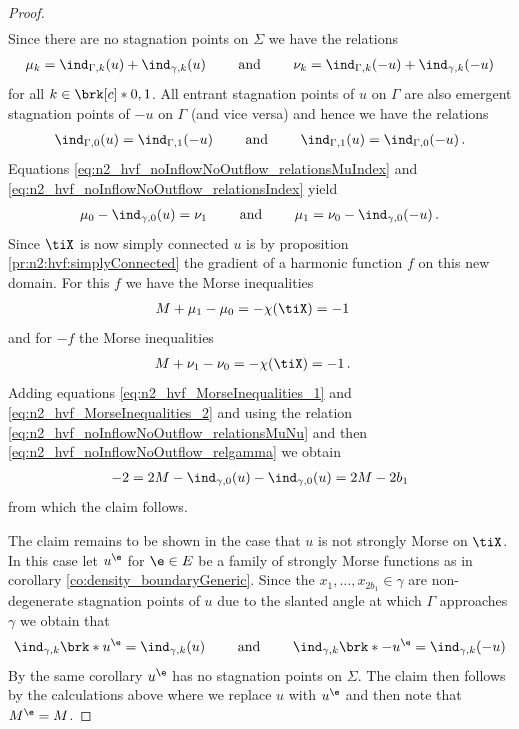 \begin{proof}
\begin{align}
  \end{align}
  Since there are no stagnation points on $\Sigma$ we have the relations
  \begin{align}
    \mu_k=\ind_{\Gamma,k}(u)+\ind_{\gamma,k}(u) \qquad\text{ and }\qquad
    \nu_k=\ind_{\Gamma,k}(-u)+\ind_{\gamma,k}(-u)\label{eq:n2_hvf_noInflowNoOutflow_relationsMuIndex}
  \end{align}
  for all $k\in\brk[c]*{0,1}$.
  All entrant stagnation points of $u$ on $\Gamma$ are also emergent
  stagnation points of $-u$ on $\Gamma$ (and vice versa) and hence we have the relations
  \begin{align}
    \ind_{\Gamma,0}(u)=\ind_{\Gamma,1}(-u) \qquad\text{ and }\qquad
    \ind_{\Gamma,1}(u)=\ind_{\Gamma,0}(-u)\,.\label{eq:n2_hvf_noInflowNoOutflow_relationsIndex}
  \end{align}
  Equations \eqref{eq:n2_hvf_noInflowNoOutflow_relationsMuIndex} and \eqref{eq:n2_hvf_noInflowNoOutflow_relationsIndex}
  yield 
  \begin{align}
    \mu_0-\ind_{\gamma,0}(u)=\nu_1 \qquad\text{ and }\qquad
    \mu_1=\nu_0-\ind_{\gamma,0}(-u)\,.\label{eq:n2_hvf_noInflowNoOutflow_relationsMuNu}
  \end{align}
  Since $\tiX$ is now simply connected $u$ is 
  by proposition \ref{pr:n2:hvf:simplyConnected}
  the gradient of a harmonic function $f$ on this new domain.
  For this $f$ we have the Morse inequalities
  \begin{align}
    M+\mu_1-\mu_0&=-\chi(\tiX)=-1 \label{eq:n2_hvf_MorseInequalities_1}
  \end{align}
  and for $-f$ the Morse inequalities
  \begin{align}
    M+\nu_1-\nu_0&=-\chi(\tiX)=-1\,. \label{eq:n2_hvf_MorseInequalities_2}
  \end{align}
  Adding equations \eqref{eq:n2_hvf_MorseInequalities_1} and \eqref{eq:n2_hvf_MorseInequalities_2} and using the relation
  \eqref{eq:n2_hvf_noInflowNoOutflow_relationsMuNu} and then \eqref{eq:n2_hvf_noInflowNoOutflow_relgamma} we obtain
  \begin{align*}
    -2=2M-\ind_{\gamma,0}(u)-\ind_{\gamma,0}(u)
    =2M-2b_1
  \end{align*}
  from which the claim follows.

  The claim remains to be shown in the case that $u$ is not strongly Morse on $\tiX$. In this case let
  $u^\e$ for $\e\in E$ be a family of strongly Morse functions as in corollary \ref{co:density_boundaryGeneric}.
  Since the $x_1,\dots,x_{2b_1}\in\gamma$ are non-degenerate stagnation points of $u$
  due to the slanted angle at which
  $\Gamma$ approaches $\gamma$
  we obtain that
  \begin{align}
    \ind_{\gamma,k}\brk*{u^\e}=\ind_{\gamma,k}(u)\qquad\text{ and }\qquad 
    \ind_{\gamma,k}\brk*{-u^\e}=\ind_{\gamma,k}(-u)
    \label{eq:n3_disproof_morse_indexApprox}
  \end{align}
  By the same corollary $u^\e$ has no stagnation points on $\Sigma$.
  The claim then follows by the calculations above where we replace
  $u$ with $u^\e$ and then note that $M^\e=M$.
\end{proof}

